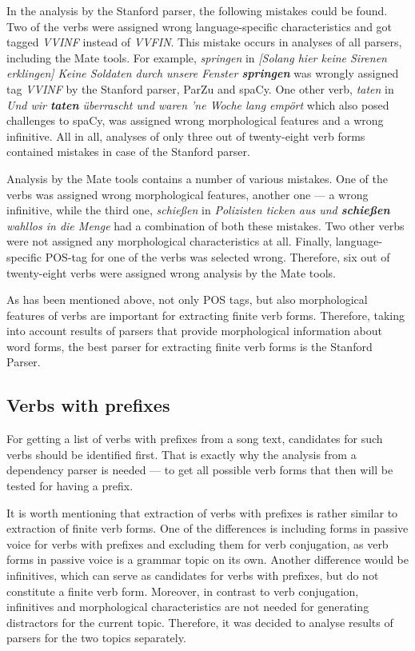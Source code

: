 In the analysis by the Stanford parser, the following mistakes could be found. Two of the verbs were assigned wrong language-specific characteristics and got tagged \textit{VVINF} instead of \textit{VVFIN}. This mistake occurs in analyses of all parsers, including the Mate tools. For example, \textit{springen} in \textit{[Solang hier keine Sirenen erklingen] Keine Soldaten durch unsere Fenster \textbf{springen}} was wrongly assigned tag \textit{VVINF} by the Stanford parser, ParZu and spaCy. One other verb, \textit{taten} in \textit{Und wir \textbf{taten} überrascht und waren 'ne Woche lang empört} which also posed challenges to spaCy, was assigned wrong morphological features and a wrong infinitive. All in all, analyses of only three out of twenty-eight verb forms contained mistakes in case of the Stanford parser.

Analysis by the Mate tools contains a number of various mistakes. One of the verbs was assigned wrong morphological features, another one --- a wrong infinitive, while the third one, \textit{schießen} in \textit{Polizisten ticken aus und \textbf{schießen} wahllos in die Menge} had a combination of both these mistakes. Two other verbs were not assigned any morphological characteristics at all. Finally, language-specific POS-tag for one of the verbs was selected wrong. Therefore, six out of twenty-eight verbs were assigned wrong analysis by the Mate tools.

As has been mentioned above, not only POS tags, but also morphological features of verbs are important for extracting finite verb forms. Therefore, taking into account results of parsers that provide morphological information about word forms, the best parser for extracting finite verb forms is the Stanford Parser.

\subsection{Verbs with prefixes}

For getting a list of verbs with prefixes from a song text, candidates for such verbs should be identified first. That is exactly why the analysis from a dependency parser is needed --- to get all possible verb forms that then will be tested for having a prefix. 

It is worth mentioning that extraction of verbs with prefixes is rather similar to extraction of finite verb forms. One of the differences is including forms in passive voice for verbs with prefixes and excluding them for verb conjugation, as verb forms in passive voice is a grammar topic on its own. Another difference would be infinitives, which can serve as candidates for verbs with prefixes, but do not constitute a finite verb form. Moreover, in contrast to verb conjugation, infinitives and morphological characteristics are not needed for generating distractors for the current topic. Therefore, it was decided to analyse results of parsers for the two topics separately.

